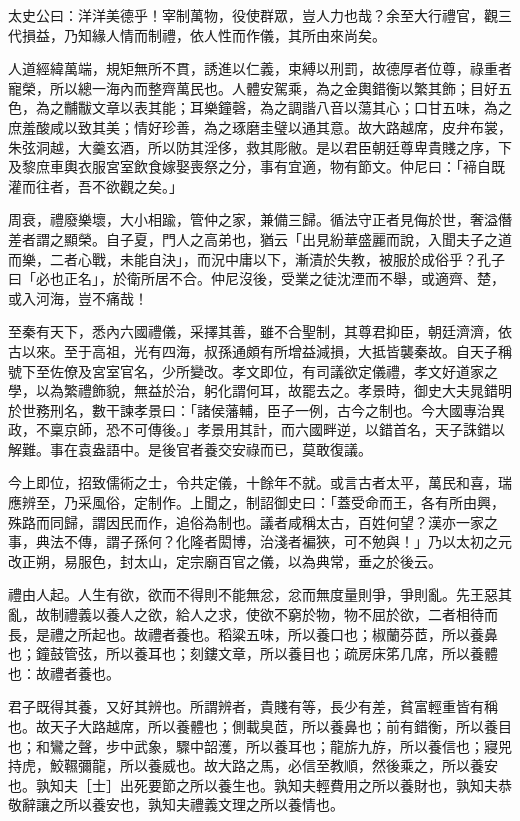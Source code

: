 
\begin{pinyinscope}
太史公曰：洋洋美德乎！宰制萬物，役使群眾，豈人力也哉？余至大行禮官，觀三代損益，乃知緣人情而制禮，依人性而作儀，其所由來尚矣。

人道經緯萬端，規矩無所不貫，誘進以仁義，束縛以刑罰，故德厚者位尊，祿重者寵榮，所以總一海內而整齊萬民也。人體安駕乘，為之金輿錯衡以繁其飾；目好五色，為之黼黻文章以表其能；耳樂鐘磬，為之調諧八音以蕩其心；口甘五味，為之庶羞酸咸以致其美；情好珍善，為之琢磨圭璧以通其意。故大路越席，皮弁布裳，朱弦洞越，大羹玄酒，所以防其淫侈，救其彫敝。是以君臣朝廷尊卑貴賤之序，下及黎庶車輿衣服宮室飲食嫁娶喪祭之分，事有宜適，物有節文。仲尼曰：「褅自既灌而往者，吾不欲觀之矣。」

周衰，禮廢樂壞，大小相踰，管仲之家，兼備三歸。循法守正者見侮於世，奢溢僭差者謂之顯榮。自子夏，門人之高弟也，猶云「出見紛華盛麗而說，入聞夫子之道而樂，二者心戰，未能自決」，而況中庸以下，漸漬於失教，被服於成俗乎？孔子曰「必也正名」，於衛所居不合。仲尼沒後，受業之徒沈湮而不舉，或適齊、楚，或入河海，豈不痛哉！

至秦有天下，悉內六國禮儀，采擇其善，雖不合聖制，其尊君抑臣，朝廷濟濟，依古以來。至于高祖，光有四海，叔孫通頗有所增益減損，大抵皆襲秦故。自天子稱號下至佐僚及宮室官名，少所變改。孝文即位，有司議欲定儀禮，孝文好道家之學，以為繁禮飾貌，無益於治，躬化謂何耳，故罷去之。孝景時，御史大夫晁錯明於世務刑名，數干諫孝景曰：「諸侯藩輔，臣子一例，古今之制也。今大國專治異政，不稟京師，恐不可傳後。」孝景用其計，而六國畔逆，以錯首名，天子誅錯以解難。事在袁盎語中。是後官者養交安祿而已，莫敢復議。

今上即位，招致儒術之士，令共定儀，十餘年不就。或言古者太平，萬民和喜，瑞應辨至，乃采風俗，定制作。上聞之，制詔御史曰：「蓋受命而王，各有所由興，殊路而同歸，謂因民而作，追俗為制也。議者咸稱太古，百姓何望？漢亦一家之事，典法不傳，謂子孫何？化隆者閎博，治淺者褊狹，可不勉與！」乃以太初之元改正朔，易服色，封太山，定宗廟百官之儀，以為典常，垂之於後云。

禮由人起。人生有欲，欲而不得則不能無忿，忿而無度量則爭，爭則亂。先王惡其亂，故制禮義以養人之欲，給人之求，使欲不窮於物，物不屈於欲，二者相待而長，是禮之所起也。故禮者養也。稻粱五味，所以養口也；椒蘭芬茝，所以養鼻也；鐘鼓管弦，所以養耳也；刻鏤文章，所以養目也；疏房床笫几席，所以養體也：故禮者養也。

君子既得其養，又好其辨也。所謂辨者，貴賤有等，長少有差，貧富輕重皆有稱也。故天子大路越席，所以養體也；側載臭茝，所以養鼻也；前有錯衡，所以養目也；和鸞之聲，步中武象，驟中韶濩，所以養耳也；龍旂九斿，所以養信也；寢兕持虎，鮫韅彌龍，所以養威也。故大路之馬，必信至教順，然後乘之，所以養安也。孰知夫［士］出死要節之所以養生也。孰知夫輕費用之所以養財也，孰知夫恭敬辭讓之所以養安也，孰知夫禮義文理之所以養情也。


\end{pinyinscope}
